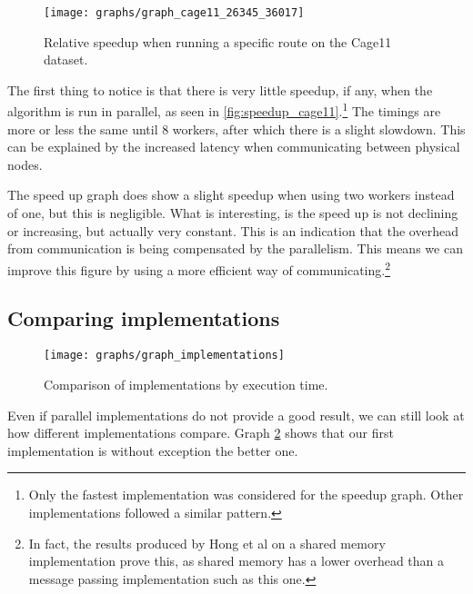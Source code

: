 \begin{figure}
  \texttt{[image: graphs/graph\_cage11\_26345\_36017]}
  \caption{Relative speedup when running a specific route on the Cage11 dataset.}
  \label{fig:speedup_cage11}
\end{figure}

The first thing to notice is that there is very little speedup, if any, when the algorithm is run in parallel, as seen in \autoref{fig:speedup_cage11}.\footnote{Only the fastest implementation was considered for the speedup graph. Other implementations followed a similar pattern.} The timings are more or less the same until 8 workers, after which there is a slight slowdown. This can be explained by the increased latency when communicating between physical nodes.

The speed up graph does show a slight speedup when using two workers instead of one, but this is negligible. What is interesting, is the speed up is not declining or increasing, but actually very constant. This is an indication that the overhead from communication is being compensated by the parallelism. This means we can improve this figure by using a more efficient way of communicating.\footnote{In fact, the results produced by Hong et al \cite{LockFreeMultithreadedMaxFlow} on a shared memory implementation prove this, as shared memory has a lower overhead than a message passing implementation such as this one.}

\subsection{Comparing implementations}

\begin{figure}
  \texttt{[image: graphs/graph\_implementations]}
  \caption{Comparison of implementations by execution time.}
  \label{fig:implmementations}
\end{figure}

Even if parallel implementations do not provide a good result, we can still look at how different implementations compare. Graph \ref{fig:implmementations} shows that our first implementation is without exception the better one.
